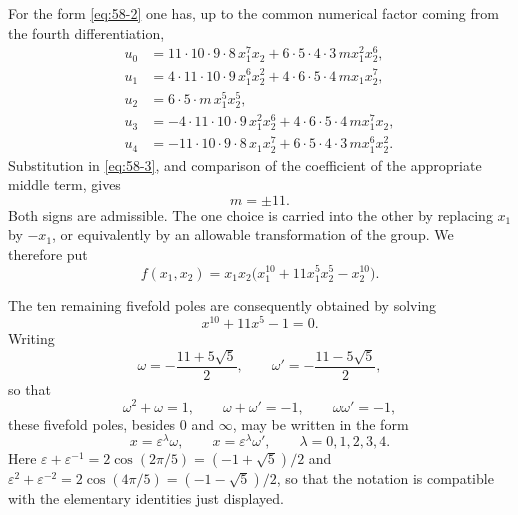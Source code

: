 \documentclass[11pt,a4paper]{book}
\newcommand{\eps}{\varepsilon}
\begin{document}
For the form \eqref{eq:58-2} one has, up to the common numerical factor coming from the fourth differentiation,
\begin{align*}
 u_0&=11\cdot10\cdot9\cdot8\,x_1^7x_2+6\cdot5\cdot4\cdot3\,m x_1^2x_2^6,\\
 u_1&=4\cdot11\cdot10\cdot9\,x_1^6x_2^2+4\cdot6\cdot5\cdot4\,m x_1x_2^7,\\
 u_2&=6\cdot5\cdot m\,x_1^5x_2^5,\\
 u_3&=-4\cdot11\cdot10\cdot9\,x_1^2x_2^6+4\cdot6\cdot5\cdot4\,m x_1^7x_2,\\
 u_4&=-11\cdot10\cdot9\cdot8\,x_1x_2^7+6\cdot5\cdot4\cdot3\,m x_1^6x_2^2.
\end{align*}
Substitution in \eqref{eq:58-3}, and comparison of the coefficient of the appropriate middle term, gives
\[
 m=\pm 11.
\]
Both signs are admissible.  The one choice is carried into the other by replacing \(x_1\) by \(-x_1\), or equivalently by an allowable transformation of the group.  We therefore put
\begin{equation}\label{eq:58-4}
 f(x_1,x_2)=x_1x_2\bigl(x_1^{10}+11x_1^5x_2^5-x_2^{10}\bigr).
\end{equation}

The ten remaining fivefold poles are consequently obtained by solving
\[
 x^{10}+11x^5-1=0.
\]
Writing
\begin{equation}\label{eq:58-5}
 \omega=-\frac{11+5\sqrt5}{2}, \qquad
 \omega'=-\frac{11-5\sqrt5}{2},
\end{equation}
so that
\begin{equation}\label{eq:58-6}
 \omega^2+\omega=1,
 \qquad \omega+\omega'=-1,
 \qquad \omega\omega'=-1,
\end{equation}
these fivefold poles, besides \(0\) and \(\infty\), may be written in the form
\begin{equation}\label{eq:58-7}
 x=\eps^\lambda\omega,
 \qquad
 x=\eps^\lambda\omega',
 \qquad \lambda=0,1,2,3,4.
\end{equation}
Here \(\eps+\eps^{-1}=2\cos(2\pi/5)=(-1+\sqrt5)/2\) and \(\eps^2+\eps^{-2}=2\cos(4\pi/5)=(-1-\sqrt5)/2\), so that the notation is compatible with the elementary identities just displayed.
\end{document}
